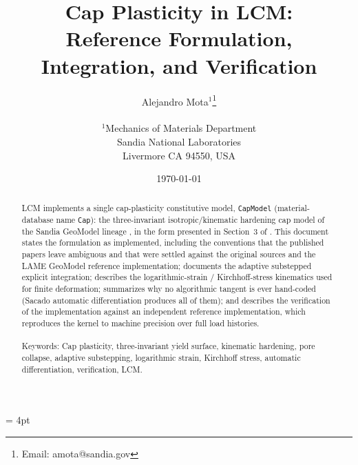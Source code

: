 \documentclass[12pt]{article}
\begin{document}
\setlength{\headheight}{15pt}
\headsep = 4pt
\pagestyle{fancyplain}



\title{
  Cap Plasticity in LCM:\\
  Reference Formulation, Integration, and Verification}

\author{
  Alejandro Mota$^1$\thanks{Email: amota@sandia.gov}\\
  \\
  $^1$Mechanics of Materials Department\\
  Sandia National Laboratories\\
  Livermore CA 94550, USA\\
}

\date{\today}

\maketitle

\begin{abstract}

  LCM implements a single cap-plasticity constitutive model,
  \texttt{CapModel} (material-database name \texttt{Cap}): the
  three-invariant isotropic/kinematic hardening cap model of the
  Sandia GeoModel lineage
  \citep{Fossum.Fredrich:2000,Fossum.Brannon:2004,Foster.etal:2005},
  in the form presented in Section~3 of \citet{Sun.Chen.Ostien:2014}.
  This document states the formulation as implemented, including the
  conventions that the published papers leave ambiguous and that were
  settled against the original sources and the LAME GeoModel reference
  implementation; documents the adaptive substepped explicit
  integration; describes the logarithmic-strain / Kirchhoff-stress
  kinematics used for finite deformation; summarizes why no
  algorithmic tangent is ever hand-coded (Sacado automatic
  differentiation produces all of them); and describes the
  verification of the implementation against an independent reference
  implementation, which reproduces the kernel to machine precision
  over full load histories.
  \\
  \\
  Keywords: Cap plasticity, three-invariant yield surface, kinematic
  hardening, pore collapse, adaptive substepping, logarithmic strain,
  Kirchhoff stress, automatic differentiation, verification, LCM.

\end{abstract}
\end{document}
